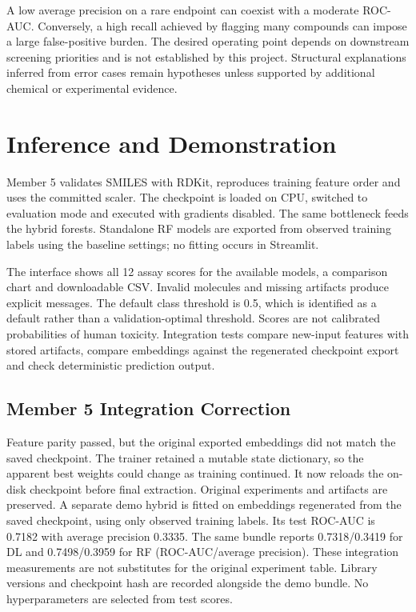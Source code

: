 \documentclass[11pt,a4paper]{article}\usepackage[margin=25mm]{geometry}\usepackage{fancyhdr}\usepackage{setspace}\usepackage{titlesec}\usepackage{xcolor}
\begin{document}
A low average precision on a rare endpoint can coexist with a moderate ROC-AUC. Conversely, a high recall achieved by flagging many compounds can impose a large false-positive burden. The desired operating point depends on downstream screening priorities and is not established by this project. Structural explanations inferred from error cases remain hypotheses unless supported by additional chemical or experimental evidence.


\section{Inference and Demonstration}
Member 5 validates SMILES with RDKit, reproduces training feature order and uses the committed scaler. The checkpoint is loaded on CPU, switched to evaluation mode and executed with gradients disabled. The same bottleneck feeds the hybrid forests. Standalone RF models are exported from observed training labels using the baseline settings; no fitting occurs in Streamlit.

The interface shows all 12 assay scores for the available models, a comparison chart and downloadable CSV. Invalid molecules and missing artifacts produce explicit messages. The default class threshold is 0.5, which is identified as a default rather than a validation-optimal threshold. Scores are not calibrated probabilities of human toxicity. Integration tests compare new-input features with stored artifacts, compare embeddings against the regenerated checkpoint export and check deterministic prediction output.

\subsection{Member 5 Integration Correction}
Feature parity passed, but the original exported embeddings did not match the saved checkpoint. The trainer retained a mutable state dictionary, so the apparent best weights could change as training continued. It now reloads the on-disk checkpoint before final extraction. Original experiments and artifacts are preserved. A separate demo hybrid is fitted on embeddings regenerated from the saved checkpoint, using only observed training labels. Its test ROC-AUC is 0.7182 with average precision 0.3335. The same bundle reports 0.7318/0.3419 for DL and 0.7498/0.3959 for RF (ROC-AUC/average precision). These integration measurements are not substitutes for the original experiment table. Library versions and checkpoint hash are recorded alongside the demo bundle. No hyperparameters are selected from test scores.
\end{document}
